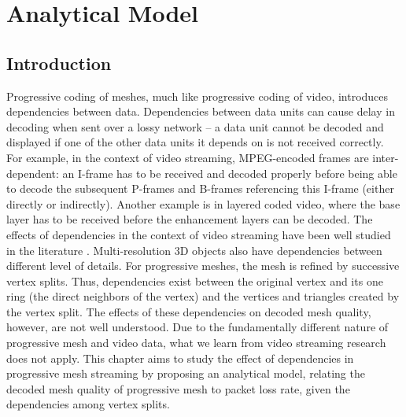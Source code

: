 \chapter{Analytical Model}
\label{c:model}
\def\tracea{UDP-High_result}
\def\traceb{UDP-Low_result}
\def\tracec{DCCP_result}
\def\mesha{Happy}
\def\meshb{Horse}
\def\meshc{Thai}
\def\mesh_h{Happy2}

\section{Introduction}
\label{s:model:intro}
    Progressive coding of meshes, much like progressive coding of
    video, introduces dependencies between data.
    Dependencies between data units can cause delay in decoding
    when sent over a lossy network -- a data unit
    cannot be decoded and displayed if one of the other data units
    it depends on is not received correctly. For example, in the
    context of video streaming, MPEG-encoded frames are inter-dependent:
        an I-frame has to be received and decoded properly
    before being able to decode the subsequent P-frames and B-frames
        referencing this I-frame (either directly or indirectly).  Another
    example is in layered coded video, where the base layer has
    to be received before the enhancement layers can be decoded.
    The effects of dependencies in the context of video streaming
    have been well studied in the literature \cite{boyce98}.   Multi-resolution 3D
    objects also have dependencies between different level of details.
        For progressive meshes, the mesh is refined by successive
    vertex splits. %
    Thus, dependencies exist between the original vertex and its one
    ring (the direct neighbors of the vertex)
    and the vertices and triangles created by the vertex split.
    The effects of these dependencies on decoded mesh quality, however,
    are not well understood.  Due to the fundamentally different
    nature of progressive mesh and video data, what we learn from
    video streaming research does not apply.  This chapter aims to study
    the effect of dependencies in progressive mesh streaming by
    proposing an analytical model, relating the decoded mesh quality
    of progressive mesh to packet loss rate, given the dependencies
    among vertex splits.

